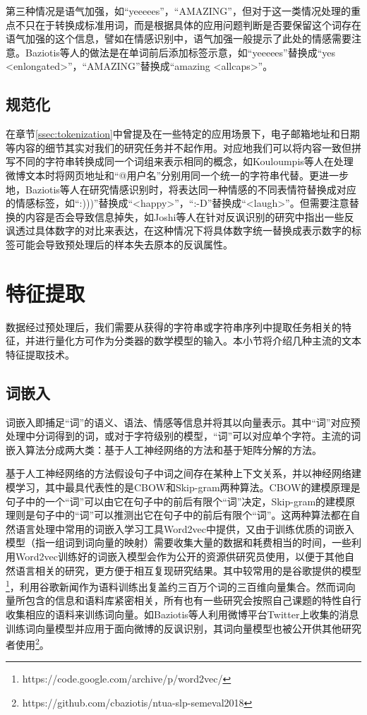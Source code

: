 第三种情况是语气加强，如“yeeeees”，“AMAZING”，但对于这一类情况处理的重点不只在于转换成标准用词，而是根据具体的应用问题判断是否要保留这个词存在语气加强的这个信息，譬如在情感识别中，语气加强一般提示了此处的情感需要注意。Baziotis等人\cite{baziotis2017semeval2}的做法是在单词前后添加标签示意，如“yeeeees”替换成“yes <enlongated>”，“AMAZING”替换成“amazing <allcaps>”。

\subsection{规范化}

在章节\ref{ssec:tokenization}中曾提及在一些特定的应用场景下，电子邮箱地址和日期等内容的细节其实对我们的研究任务并不起作用。对应地我们可以将内容一致但拼写不同的字符串转换成同一个词组来表示相同的概念，如Kouloumpis等人\cite{kouloumpis2011twitter}在处理微博文本时将网页地址和“@用户名”分别用同一个统一的字符串代替。更进一步地，Baziotis等人\cite{baziotis2017semeval2}在研究情感识别时，将表达同一种情感的不同表情符替换成对应的情感标签，如“:)))”替换成“<happy>”，“:-D”替换成“<laugh>”。但需要注意替换的内容是否会导致信息掉失，如Joshi等人\cite{joshi2015harnessing}在针对反讽识别的研究中指出一些反讽透过具体数字的对比来表达，在这种情况下将具体数字统一替换成表示数字的标签可能会导致预处理后的样本失去原本的反讽属性。

\section{特征提取}

数据经过预处理后，我们需要从获得的字符串或字符串序列中提取任务相关的特征，并进行量化方可作为分类器的数学模型的输入。本小节将介绍几种主流的文本特征提取技术。

\subsection{词嵌入}
\label{ssec:embedding}

词嵌入即捕足“词”的语义、语法、情感等信息并将其以向量表示。其中“词”对应预处理中分词得到的词，或对于字符级别的模型，“词”可以对应单个字符\cite{baziotis2018ntua}。主流的词嵌入算法分成两大类：基于人工神经网络的方法和基于矩阵分解的方法。

基于人工神经网络的方法假设句子中词之间存在某种上下文关系，并以神经网络建模学习，其中最具代表性的是CBOW和Skip-gram两种算法。CBOW的建模原理是句子中的一个“词”可以由它在句子中的前后有限个“词”决定，Skip-gram的建模原理则是句子中的“词”可以推测出它在句子中的前后有限个“词”。这两种算法都在自然语言处理中常用的词嵌入学习工具Word2vec\cite{mikolov2013efficient}中提供，又由于训练优质的词嵌入模型（指一组词到词向量的映射）需要收集大量的数据和耗费相当的时间，一些利用Word2vec训练好的词嵌入模型会作为公开的资源供研究员使用，以便于其他自然语言相关的研究，更方便于相互复现研究结果。其中较常用的是谷歌提供的模型\footnote{https://code.google.com/archive/p/word2vec/}，利用谷歌新闻作为语料训练出复盖约三百万个词的三百维向量集合。然而词向量所包含的信息和语料库紧密相关，所有也有一些研究会按照自己课题的特性自行收集相应的语料来训练词向量。如Baziotis等人\cite{baziotis2017semeval2}利用微博平台Twitter上收集的消息训练词向量模型并应用于面向微博的反讽识别，其词向量模型也被公开供其他研究者使用\footnote{https://github.com/cbaziotis/ntua-slp-semeval2018}。


